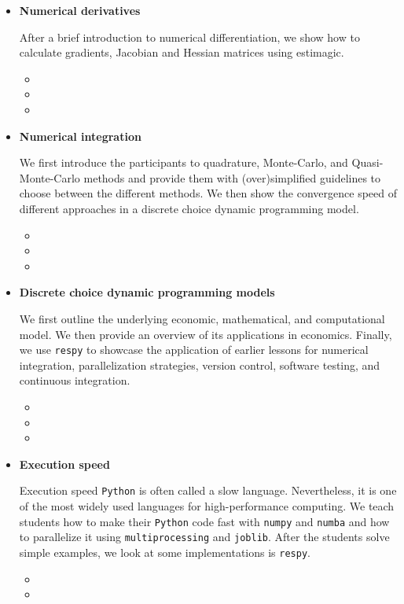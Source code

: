 \begin{itemize}
\item \textbf{Numerical derivatives}

After a brief introduction to numerical differentiation, we show how to calculate gradients, Jacobian and Hessian matrices using estimagic.

\begin{itemize}
  \item {}
  \item {}
  \item {}
\end{itemize}

\item \textbf{Numerical integration}

We first introduce the participants to quadrature, Monte-Carlo, and Quasi-Monte-Carlo methods and provide them with (over)simplified guidelines to choose between the different methods. We then show the convergence speed of different approaches in a discrete choice dynamic programming model.

\begin{itemize}
  \item {}
  \item {}
  \item {}
\end{itemize}

\item \textbf{Discrete choice dynamic programming models}

We first outline the underlying economic, mathematical, and computational model. We then provide an overview of its applications in economics. Finally, we use \verb+respy+ to showcase the application of earlier lessons for numerical integration, parallelization strategies, version control, software testing, and continuous integration.

\begin{itemize}
\item {}
\item {}
\item {}
\end{itemize}

\item \textbf{Execution speed}

Execution speed \verb+Python+ is often called a slow language. Nevertheless, it is one of the most widely used languages for high-performance computing. We teach students how to make their \verb+Python+ code fast with \verb+numpy+ and \verb+numba+ and how to parallelize it using \verb+multiprocessing+ and \verb+joblib+. After the students solve simple examples, we look at some implementations is \verb+respy+.


\begin{itemize}
\item {}
\item {}
\end{itemize}


\end{itemize}





